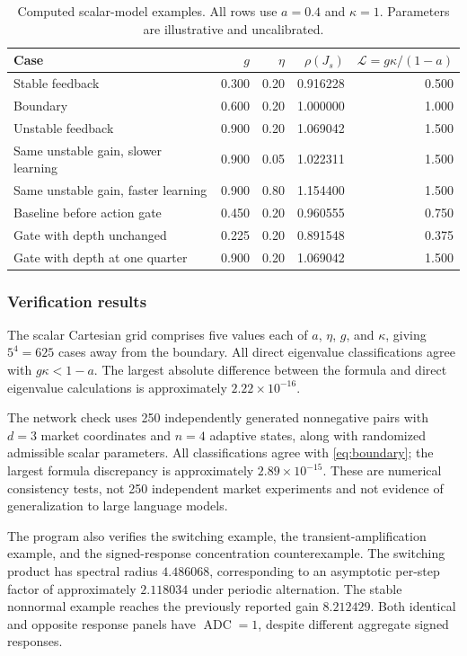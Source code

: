 \documentclass[10pt,twocolumn,letterpaper]{article}
\theoremstyle{definition}
\theoremstyle{remark}
\newcommand{\ADC}{\operatorname{ADC}}
\begin{document}
\begin{table}[htbp]
\centering\small
\caption{Computed scalar-model examples. All rows use $a=0.4$ and $\kappa=1$. Parameters are illustrative and uncalibrated.}
\label{tab:scalar}
\begin{tabularx}{\textwidth}{Yrrrr}
\toprule
Case & $g$ & $\eta$ & $\rho(J_s)$ & $\mathcal L=g\kappa/(1-a)$\\
\midrule
Stable feedback & 0.300 & 0.20 & 0.916228 & 0.500\\
Boundary & 0.600 & 0.20 & 1.000000 & 1.000\\
Unstable feedback & 0.900 & 0.20 & 1.069042 & 1.500\\
Same unstable gain, slower learning & 0.900 & 0.05 & 1.022311 & 1.500\\
Same unstable gain, faster learning & 0.900 & 0.80 & 1.154400 & 1.500\\
Baseline before action gate & 0.450 & 0.20 & 0.960555 & 0.750\\
Gate with depth unchanged & 0.225 & 0.20 & 0.891548 & 0.375\\
Gate with depth at one quarter & 0.900 & 0.20 & 1.069042 & 1.500\\
\bottomrule
\end{tabularx}
\end{table}

\subsubsection{Verification results}
The scalar Cartesian grid comprises five values each of $a$, $\eta$, $g$, and $\kappa$, giving $5^4=625$ cases away from the boundary. All direct eigenvalue classifications agree with $g\kappa<1-a$. The largest absolute difference between the formula and direct eigenvalue calculations is approximately $2.22\times10^{-16}$.

The network check uses 250 independently generated nonnegative pairs with $d=3$ market coordinates and $n=4$ adaptive states, along with randomized admissible scalar parameters. All classifications agree with \cref{eq:boundary}; the largest formula discrepancy is approximately $2.89\times10^{-15}$. These are numerical consistency tests, not 250 independent market experiments and not evidence of generalization to large language models.

The program also verifies the switching example, the transient-amplification example, and the signed-response concentration counterexample. The switching product has spectral radius $4.486068$, corresponding to an asymptotic per-step factor of approximately $2.118034$ under periodic alternation. The stable nonnormal example reaches the previously reported gain $8.212429$. Both identical and opposite response panels have $\ADC=1$, despite different aggregate signed responses.
\end{document}
